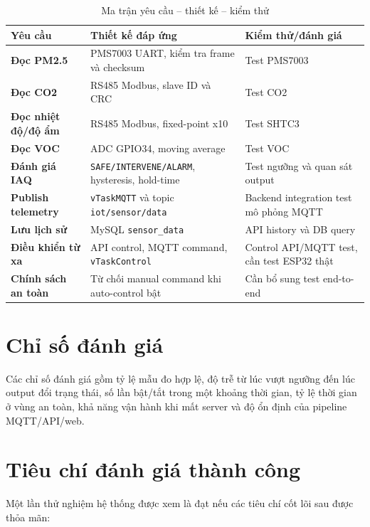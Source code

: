 \begin{table}[H]
    \centering
    \caption{Ma trận yêu cầu -- thiết kế -- kiểm thử}
    \begin{tabularx}{\textwidth}{>{\bfseries}l X X}
        \toprule
        Yêu cầu & Thiết kế đáp ứng & Kiểm thử/đánh giá \\
        \midrule
        Đọc PM2.5 & PMS7003 UART, kiểm tra frame và checksum & Test PMS7003 \\
        Đọc CO2 & RS485 Modbus, slave ID và CRC & Test CO2 \\
        Đọc nhiệt độ/độ ẩm & RS485 Modbus, fixed-point x10 & Test SHTC3 \\
        Đọc VOC & ADC GPIO34, moving average & Test VOC \\
        Đánh giá IAQ & \texttt{SAFE/INTERVENE/ALARM}, hysteresis, hold-time & Test ngưỡng và quan sát output \\
        Publish telemetry & \texttt{vTaskMQTT} và topic \texttt{iot/sensor/data} & Backend integration test mô phỏng MQTT \\
        Lưu lịch sử & MySQL \texttt{sensor\_data} & API history và DB query \\
        Điều khiển từ xa & API control, MQTT command, \texttt{vTaskControl} & Control API/MQTT test, cần test ESP32 thật \\
        Chính sách an toàn & Từ chối manual command khi auto-control bật & Cần bổ sung test end-to-end \\
        \bottomrule
    \end{tabularx}
\end{table}

\section{Chỉ số đánh giá}

Các chỉ số đánh giá gồm tỷ lệ mẫu đo hợp lệ, độ trễ từ lúc vượt ngưỡng đến lúc output đổi trạng thái, số lần bật/tắt trong một khoảng thời gian, tỷ lệ thời gian ở vùng an toàn, khả năng vận hành khi mất server và độ ổn định của pipeline MQTT/API/web.

\section{Tiêu chí đánh giá thành công}

Một lần thử nghiệm hệ thống được xem là đạt nếu các tiêu chí cốt lõi sau được thỏa mãn:

